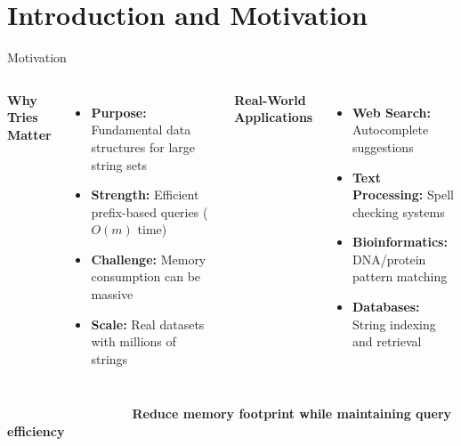 \documentclass[aspectratio=169]{beamer}
\begin{document}
\begin{frame}[plain]
	\titlepage
\end{frame}



\section{Introduction and Motivation}

\begin{frame}{Motivation}
	\begin{columns}[t]
		\textcolor{oiVermillion}{\textbf{Why Tries Matter}}
		\begin{itemize}
			\item \textbf{Purpose:} Fundamental data structures for large string sets
			\item \textbf{Strength:} Efficient prefix-based queries ($O(m)$ time)
			\item \textbf{Challenge:} Memory consumption can be massive
			\item \textbf{Scale:} Real datasets with millions of strings
		\end{itemize}

		\textcolor{oiBlue}{\textbf{Real-World Applications}}
		\begin{itemize}
			\item \textbf{Web Search:} Autocomplete suggestions
			\item \textbf{Text Processing:} Spell checking systems
			\item \textbf{Bioinformatics:} DNA/protein pattern matching
			\item \textbf{Databases:} String indexing and retrieval
		\end{itemize}
	\end{columns}

	\vspace{0.4cm}
	\centering
	\begin{block}{\textcolor{white}{\textbf{Research Objective}}}
		\textbf{Reduce memory footprint while maintaining query efficiency}\\
	\end{block}
\end{frame}
\end{document}

